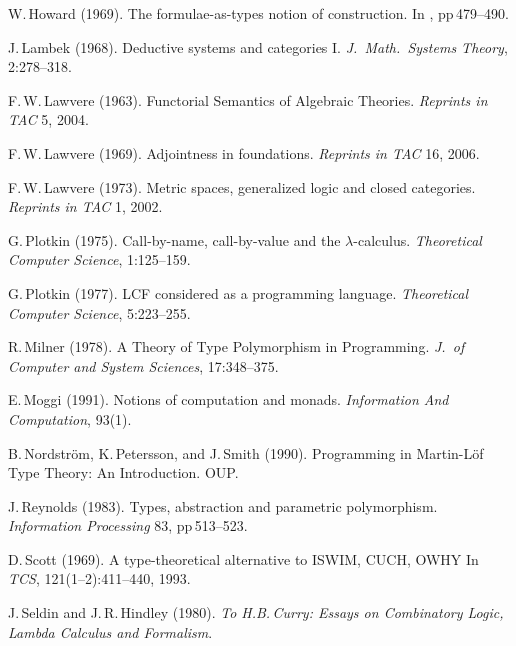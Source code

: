 \documentclass[11pt,twocolumn]{article}
\begin{document}
{\begin{thebibliography}{00}
W.\,Howard (1969).
\newblock The formulae-as-types notion of construction.
\newblock In \emph{\cite{ToHBCurry}}, pp\,479--490. 

J.\,Lambek (1968).
\newblock Deductive systems and categories I.
\newblock \emph{J.\ Math.\ Systems Theory}, 2:278--318.

F.\,W.\,Lawvere (1963). %
\newblock Functorial Semantics of Algebraic Theories. %
\newblock \emph{Reprints in TAC} 5, 2004.

F.\,W.\,Lawvere (1969).
\newblock Adjointness in foundations.
\newblock \emph{Reprints in TAC} 16, 2006.

F.\,W.\,Lawvere (1973).
\newblock Metric spaces, generalized logic and closed categories.
\newblock \emph{Reprints in TAC} 1, 2002.

G.\,Plotkin (1975).
\newblock Call-by-name, call-by-value and the \mbox{$\lambda$-calculus}.
\newblock \emph{Theoretical Computer Science}, 1:125--159.

G.\,Plotkin (1977).
\newblock LCF considered as a programming language.
\newblock \emph{Theoretical Computer Science}, 5:223--255.

R.\,Milner (1978).
\newblock A Theory of Type Polymorphism in Programming.
\newblock \emph{J.\ of Computer and System Sciences}, 17:348--375.

E.\,Moggi (1991).
\newblock Notions of computation and monads. 
\newblock \emph{Information And Computation}, 93(1).

B.\,Nordstr\"om, K.\,Petersson, and J.\,Smith (1990).
\newblock Programming in Martin-L\"of Type Theory: An Introduction.
\newblock OUP.

J.\,Reynolds (1983).
\newblock Types, abstraction and parametric polymorphism.
\newblock \emph{Information Processing} 83, pp\,513--523.

D.\,Scott (1969).
\newblock A type-theoretical alternative to ISWIM, CUCH, OWHY
\newblock In \emph{TCS}, 121(1--2):411--440, 1993.

J.\,Seldin and J.\,R.\,Hindley (1980).
\newblock \emph{To H.B.\,Curry: Essays on Combinatory Logic, Lambda
  Calculus and Formalism}.


\end{thebibliography}}
\end{document}
